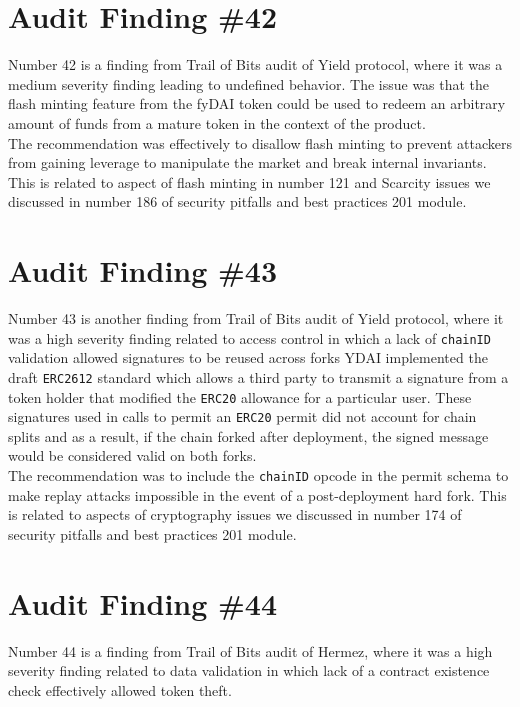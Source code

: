 \section{Audit Finding \#42}

Number 42 is a finding from Trail of Bits audit of Yield protocol, where it was a medium severity finding leading to undefined behavior. The issue was that the flash minting feature from the fyDAI token could be used to redeem an arbitrary amount of funds from a mature token in the context of the product.\\

The recommendation was effectively to disallow flash minting to prevent attackers from gaining leverage to manipulate the market and break internal invariants. This is related to aspect of flash minting in number 121 and Scarcity issues we discussed in number 186 of security pitfalls and best practices 201 module.

\section{Audit Finding \#43}

Number 43 is another finding from Trail of Bits audit of Yield protocol, where it was a high severity finding related to access control in which a lack of \verb|chainID| validation allowed signatures to be reused across forks YDAI implemented the draft \verb|ERC2612| standard which allows a third party to transmit a signature from a token holder that modified the \verb|ERC20| allowance for a particular user. These signatures used in calls to permit an \verb|ERC20| permit did not account for chain splits and as a result, if the chain forked after deployment, the signed message would be considered valid on both forks.\\

The recommendation was to include the \verb|chainID| opcode in the permit schema to make replay attacks impossible in the event of a post-deployment hard fork. This is related to aspects of cryptography issues we discussed in number 174 of security pitfalls and best practices 201 module.

\section{Audit Finding \#44}

Number 44 is a finding from Trail of Bits audit of Hermez, where it was a high severity finding related to data validation in which lack of a contract existence check effectively allowed token theft.\\

